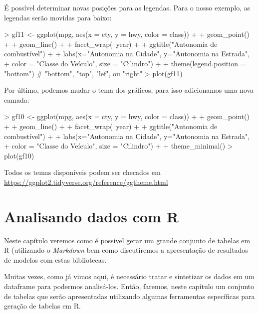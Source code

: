 \documentclass[12pt,a4paper,oneside]{erdc}
\begin{document}
É possível determinar novas posições para as legendas. Para o nosso exemplo, as legendas serão movidas para baixo:

\begin{Schunk}
\begin{Sinput}
> gf11 <- ggplot(mpg, aes(x = cty, y = hwy, color = class)) +
+ geom_point() +
+ geom_line() +
+ facet_wrap(~year) +
+ ggtitle("Autonomia de combustível") +
+ labs(x="Autonomia na Cidade", y="Autonomia na Estrada",
+ color = "Classe do Veículo", size = "Cilindro") +
+ theme(legend.position = "bottom") # "bottom", "top", "lef", ou "right" 
> plot(gf11)
\end{Sinput}
\end{Schunk}

Por último, podemos mudar o tema dos gráficos, para isso adicionamos uma nova camada:

\begin{Schunk}
\begin{Sinput}
> gf10 <- ggplot(mpg, aes(x = cty, y = hwy, color = class)) +
+ geom_point() +
+ geom_line() +
+ facet_wrap(~year) +
+ ggtitle("Autonomia de combustível") +
+ labs(x="Autonomia na Cidade", y="Autonomia na Estrada",
+ color = "Classe do Veículo", size = "Cilindro") +
+ theme_minimal() 
> plot(gf10)
\end{Sinput}
\end{Schunk}

Todos os temas disponíveis podem ser checados em \url{https://ggplot2.tidyverse.org/reference/ggtheme.html}




%
%
%


\chapter{Analisando dados com R}

	Neste capítulo veremos como é possível gerar um grande conjunto de tabelas em R (utilizando o \textit{Markdown} bem como discutiremos a apresentação de resultados de modelos com estas bibliotecas.
	
	Muitas vezes, como já vimos aqui, é necessário tratar e sintetizar os dados em um dataframe para podermos analisá-los. Então, faremos, neste capítulo um conjunto de tabelas que serão apresentadas utilizando algumas ferramentas específicas para geração de tabelas em R. 
	
\end{document}
